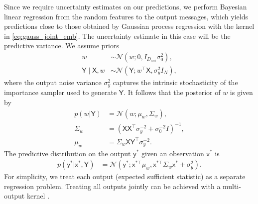 \documentclass[english]{article}
\theoremstyle{plain}
\theoremstyle{plain}
\begin{document}
Since we require uncertainty estimates on our predictions,
we perform Bayesian linear regression from the random features to the output messages,
which yields predictions close to those obtained by Gaussian process regression
with the kernel in \eqref{eq:gauss_joint_emb}.
The uncertainty estimate in this case will be the predictive 
variance.
We assume priors 
\begin{align}
w & \sim\mathcal{N}\left(w;0,I_{D_\mathrm{out}}\sigma_{0}^{2}\right), \\
\mathsf{Y} \mid \mathsf{X},w & \sim\mathcal{N}\left(\mathsf{Y};w^{\top} \mathsf{X},\sigma_{y}^{2}I_{N}\right),
\end{align}
%
where the output noise variance $\sigma_{y}^{2}$ captures the intrinsic
stochasticity of the importance sampler used to generate $\mathsf{Y}$. It
follows that the posterior of $w$ is given by \citet{Bishop2006}
%
\begin{align}
p(w | \mathsf{Y}) & =\mathcal{N}(w;\mu_{w},\Sigma_{w}), \\
\Sigma_{w} & = \left( \mathsf{X} \mathsf{X}^{\top}\sigma_{y}^{-2}+\sigma_{0}^{-2}I \right)^{-1}, \\
\mu_{w} & =\Sigma_{w} \mathsf{X} \mathsf{Y}^{\top}\sigma_{y}^{-2}.
\end{align}
The predictive distribution on the output $\mathsf{y}^{*}$ given an 
observation $\mathsf{x}^{*}$ is
%
\begin{align}
p(\mathsf{y}^{*}| \mathsf{x}^{*}, \mathsf{Y}) 
 & =\mathcal{N}\left(\mathsf{y}^{*}; \mathsf{x}^{*\top}\mu_{w}, \mathsf{x}^{*\top}\Sigma_{w} \mathsf{x}^{*}+\sigma_{y}^{2}\right).
\end{align}
%
For simplicity, we treat each output (expected sufficient statistic) as a separate regression problem. 
Treating all outputs jointly can be achieved with a multi-output kernel \citep{Alvarez2011}.
 
\end{document}
